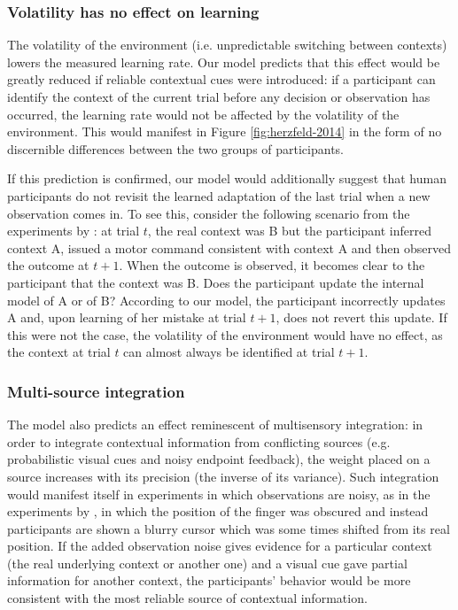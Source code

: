 \documentclass[a4paper,doc,floatsintext,natbib]{apa6}
\def \fref #1{Figure \ref{#1}}     %
\begin{document}
\subsubsection{Volatility has no effect on learning}
The volatility of the environment (i.e. unpredictable switching between contexts) lowers the measured learning rate. Our model predicts that this effect would be greatly reduced if reliable contextual cues were introduced: if a participant can identify the context of the current trial before any decision or observation has occurred, the learning rate would not be affected by the volatility of the environment. This would manifest in \fref{fig:herzfeld-2014} in the form of no discernible differences between the two groups of participants.

If this prediction is confirmed, our model would additionally suggest that human participants do not revisit the learned adaptation of the last trial when a new observation comes in. To see this, consider the following scenario from the experiments by \cite{Herzfeld_memory_2014}: at trial $t$, the real context was B but the participant inferred context A, issued a motor command consistent with context A and then observed the outcome at $t + 1$. When the outcome is observed, it becomes clear to the participant that the context was B. Does the participant update the internal model of A or of B? According to our model, the participant incorrectly updates A and, upon learning of her mistake at trial $t+1$, does not revert this update. If this were not the case, the volatility of the environment would have no effect, as the context at trial $t$ can almost always be identified at trial $t+1$.

\subsubsection{Multi-source integration}
The model also predicts an effect reminescent of multisensory integration: in order to integrate contextual information from conflicting sources (e.g. probabilistic visual cues and noisy endpoint feedback), the weight placed on a source increases with its precision (the inverse of its variance). Such integration would manifest itself in experiments in which observations are noisy, as in the experiments by \cite{Kording_Bayesian_2004}, in which the position of the finger was obscured and instead participants are shown a blurry cursor which was some times shifted from its real position. If the added observation noise gives evidence for a particular context (the real underlying context or another one) and a visual cue gave partial information for another context, the participants' behavior would be more consistent with the most reliable source of contextual information.
\end{document}
